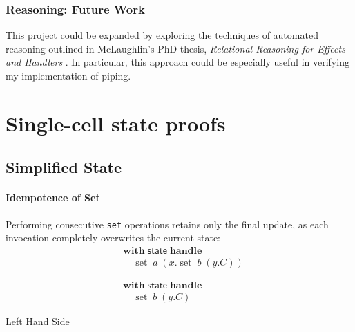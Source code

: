 \documentclass[logo,bsc,singlespacing,parskip]{infthesis}
\begin{document}
\subsection*{Reasoning: Future Work}
This project could be expanded by exploring the techniques of automated reasoning outlined in McLaughlin's PhD thesis, \textit{Relational Reasoning for Effects and Handlers
} \cite{McLaughlin2020}. In particular, this approach could be especially useful in verifying my implementation of piping.

% 




\appendix

\chapter{Single-cell state proofs} 

\section{Simplified State} \label{full-simplified-single-cell-state-proof}

\subsubsection*{Idempotence of Set}
Performing consecutive \lstinline{set} operations retains only the final update, as each invocation completely overwrites the current state:
\[
\begin{aligned}
    &\mathsf{\textbf{with}} \; \mathsf{state} \; \mathsf{\textbf{handle}} \\
    &\quad \operatorname{set} \; a \; (x. \operatorname{set} \; b \; (y. C)) \\
    &\equiv \\
    &\mathsf{\textbf{with}} \; \mathsf{state} \; \mathsf{\textbf{handle}} \\
    &\quad \operatorname{set} \; b \; (y. C)
\end{aligned}
\]

\underline{Left Hand Side}
\end{document}
